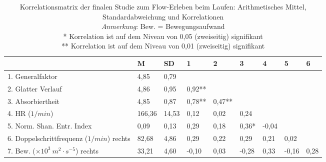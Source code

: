\documentclass[12pt, twoside=semi, DIV=calc, pagesize, parskip=half, listof=totoc, bibliography=totoc, open=right, listof=nochaptergap, pointlessnumbers, final]{scrreprt}
\begin{document}
\begin{sidewaystable}
	\centering \caption[Korrelationsmatrix (Finale Studie: Laufen)]{Korrelationsmatrix der finalen Studie zum Flow-Erleben beim Laufen: Arithmetisches Mittel, Standardabweichung und Korrelationen\\
	\hspace{
	\textwidth}\emph{Anmerkung}: Bew. = Bewegungsaufwand \\
	\hspace{
	\textwidth}* Korrelation ist auf dem Niveau von 0,05 (zweiseitig) signifikant \\
	\hspace{
	\textwidth}** Korrelation ist auf dem Niveau von 0,01 (zweiseitig) signifikant} \label{tab:korrelationen_3} 
	\begin{tabular}
		{lxxxxxxxx} \toprule & M & SD & 1 & 2 & 3 & 4 & 5 & 6 \\
		. Generalfaktor & 4,85 & 0,79 & & & & & & \\
		2. Glatter Verlauf & 4,86 & 0,95 & 0,92** & & & & & \\
		3. Absorbiertheit & 4,85 & 0,87 & 0,78** & 0,47** & & & & \\
		4. HR ($1/min$) & 166,36 & 14,53 & 0,12 & 0,02 & 0,24 & & & \\
		5. Norm. Shan. Entr. Index & 0,09 & 0,13 & 0,29 & 0,18 & 0,36* & -0,04 & & \\
		6. Doppelschrittfrequenz ($1/min$) rechts & 82,68 & 4,86 & 0,29 & 0,22 & 0,29 & 0,21 & 0,02 & \\
		7. Bew. ($\times 10^3 \: m^2 \cdot s^{-5}$) rechts & 33,21 & 4,60 & -0,10 & 0,03 & -0,28 & 0,33 & -0,16 & 0,28 \\
		\bottomrule 
	\end{tabular}
\end{sidewaystable}
\end{document}
